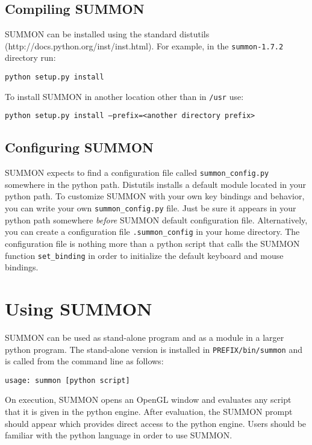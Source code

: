 \documentclass[12pt]{article}
\newcommand{\code}[1]{{\tt #1}}
\newcommand{\codeblock}[1]{\vspace{.1in} {\tt #1} \vspace{.1in}}
\newcommand{\version}{1.7.2}
\begin{document}
\subsection{Compiling SUMMON}

SUMMON can be installed using the standard distutils 
(http://docs.python.org/inst/inst.html).  For example, in the
\code{summon-\version} directory run:

\codeblock{python setup.py install}

To install SUMMON in another location other than in \code{/usr} use:

\codeblock{python setup.py install --prefix=<another directory prefix>}


\subsection{Configuring SUMMON}

SUMMON expects to find a configuration file called  \code{summon\_config.py}
somewhere in the python path.  Distutils installs a default module located in
your python path.  To customize SUMMON with your own key bindings and behavior,
you can write your own \code{summon\_config.py} file.  Just be sure it appears
in your python path somewhere {\em before} SUMMON default configuration file. 
Alternatively, you can create a configuration file \code{.summon\_config} in
your home directory.  The configuration file is nothing more than a python
script that calls the SUMMON function  \code{set\_binding} in order to
initialize the default keyboard and mouse  bindings.



\section{Using SUMMON}
\label{sec:using}

SUMMON can be used as stand-alone program and as a module in a larger python
program.  The stand-alone version is installed in \code{PREFIX/bin/summon} and
is called from the command line as follows:

\codeblock{usage: summon [python script]}

On execution, SUMMON opens an OpenGL window and evaluates any script that it is
given in the python engine. After evaluation, the SUMMON prompt should appear
which provides direct access to the python engine.  Users should be familiar
with the python language in order to use SUMMON.
\end{document}
